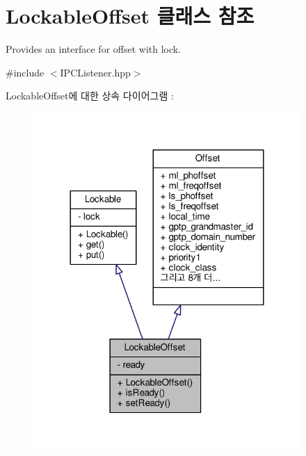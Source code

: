 \hypertarget{class_lockable_offset}{}\section{Lockable\+Offset 클래스 참조}
\label{class_lockable_offset}


Provides an interface for offset with lock.  




{\ttfamily \#include $<$I\+P\+C\+Listener.\+hpp$>$}



Lockable\+Offset에 대한 상속 다이어그램 \+: 
\nopagebreak
\begin{figure}[H]
\begin{center}
\leavevmode
\includegraphics[width=288pt]{class_lockable_offset__inherit__graph}
\end{center}
\end{figure}


